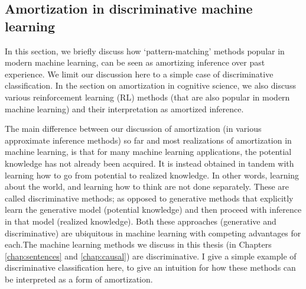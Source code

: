 \subsection{Amortization in discriminative machine learning}

In this section, we briefly discuss how `pattern-matching' methods popular in modern machine learning, can be seen as amortizing inference over past experience. We limit our discussion here to a simple case of discriminative classification. In the section on amortization in cognitive science, we also discuss various reinforcement learning (RL) methods (that are also popular in modern machine learning) and their interpretation as amortized inference.

The main difference between our discussion of amortization (in various approximate inference methods) so far and most realizations of amortization in machine learning, is that for many machine learning applications, the potential knowledge has not already been acquired. It is instead obtained in tandem with learning how to go from potential to realized knowledge. In other words, learning about the world, and learning how to think are not done separately. These are called discriminative methods; as opposed to generative methods that explicitly learn the generative model (potential knowledge) and then proceed with inference in that model (realized knowledge). Both these approaches (generative and discriminative) are ubiquitous in machine learning with competing advantages for each\citep{ng2002discriminative, lasserre2006principled}.The machine learning methods we discuss in this thesis (in Chapters \ref{chap:sentences} and \ref{chap:causal}) are discriminative. I give a simple example of discriminative classification here, to give an intuition for how these methods can be interpreted as a form of amortization.

